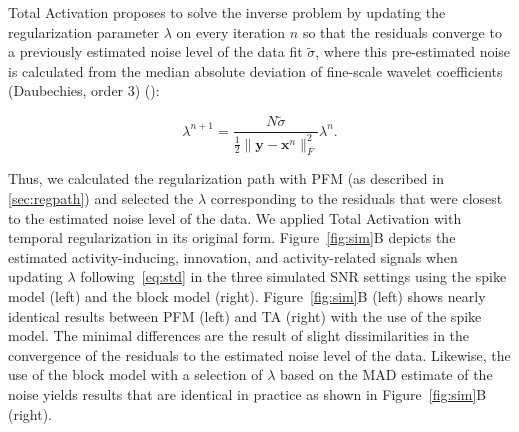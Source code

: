 
Total Activation proposes to solve the inverse problem by updating the regularization parameter \(\lambda\) on every iteration \(n\) so that the residuals converge to a previously estimated noise level of the data fit \(\tilde{\sigma}\), where this pre-estimated noise is calculated from the median absolute deviation of fine-scale wavelet coefficients (Daubechies, order 3) (\citealt{karahanoglu2013TotalActivationFMRI}):

\begin{equation}
    \lambda^{n+1} = \frac{N \tilde{\sigma}}{\frac{1}{2} \| \mathbf{y} - \mathbf{x}^n \|_F^2} \lambda^n.
\label{eq:std}
\end{equation}

Thus, we calculated the regularization path with PFM (as described in \ref{sec:regpath}) and selected the \(\lambda\) corresponding to the residuals that were closest to the estimated noise level of the data. We applied Total Activation with temporal regularization in its original form. Figure~\ref{fig:sim}B depicts the estimated activity-inducing, innovation, and activity-related signals when updating \(\lambda\) following~\eqref{eq:std} in the three simulated SNR settings using the spike model (left) and the block model (right). Figure~\ref{fig:sim}B (left) shows nearly identical results between PFM (left) and TA (right) with the use of the spike model. The minimal differences are the result of slight dissimilarities in the convergence of the residuals to the estimated noise level of the data. Likewise, the use of the block model with a selection of \(\lambda\) based on the MAD estimate of the noise yields results that are identical in practice as shown in Figure~\ref{fig:sim}B (right).

